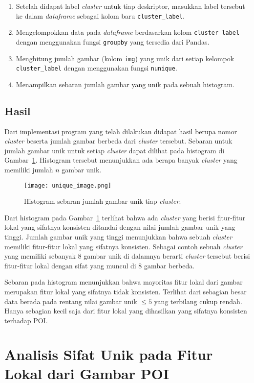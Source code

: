 \begin{enumerate}
	\item Setelah didapat label \textit{cluster} untuk tiap deskriptor, masukkan label tersebut ke dalam \textit{dataframe} sebagai kolom baru \texttt{cluster\_label}.
	\item Mengelompokkan data pada \textit{dataframe} berdasarkan kolom \texttt{cluster\_label} dengan menggunakan fungsi \texttt{groupby} yang tersedia dari Pandas.
	\item Menghitung jumlah gambar (kolom \texttt{img}) yang unik dari setiap kelompok \texttt{cluster\_label} dengan menggunakan fungsi \texttt{nunique}.
	\item Menampilkan sebaran jumlah gambar yang unik pada sebuah histogram.
\end{enumerate}

\subsection{Hasil}
Dari implementasi program yang telah dilakukan didapat hasil berupa nomor \textit{cluster} beserta jumlah gambar berbeda dari \textit{cluster} tersebut. Sebaran untuk jumlah gambar unik untuk setiap \textit{cluster} dapat dilihat pada histogram di Gambar~\ref{fig:unique_image}. Histogram tersebut menunjukkan ada berapa banyak \textit{cluster} yang memiliki jumlah $n$ gambar unik. 
\begin{figure}[H]
	\centering
	\texttt{[image: unique\_image.png]}
	\caption{Histogram sebaran jumlah gambar unik tiap \textit{cluster}.}
	\label{fig:unique_image}
\end{figure}
Dari histogram pada Gambar~\ref{fig:unique_image} terlihat bahwa ada \textit{cluster} yang berisi fitur-fitur lokal yang sifatnya konsisten ditandai dengan nilai jumlah gambar unik yang tinggi. Jumlah gambar unik yang tinggi menunjukkan bahwa sebuah \textit{cluster} memiliki fitur-fitur lokal yang sifatnya konsisten. Sebagai contoh sebuah \textit{cluster} yang memiliki sebanyak 8 gambar unik di dalamnya berarti \textit{cluster} tersebut berisi fitur-fitur lokal dengan sifat yang muncul di 8 gambar berbeda. 

Sebaran pada histogram menunjukkan bahwa mayoritas fitur lokal dari gambar merupakan fitur lokal yang sifatnya tidak konsisten. Terlihat dari sebagian besar data berada pada rentang nilai gambar unik $\leq5$ yang terbilang cukup rendah. Hanya sebagian kecil saja dari fitur lokal yang dihasilkan yang sifatnya konsisten terhadap POI.

\section{Analisis Sifat Unik pada Fitur Lokal dari Gambar POI}

